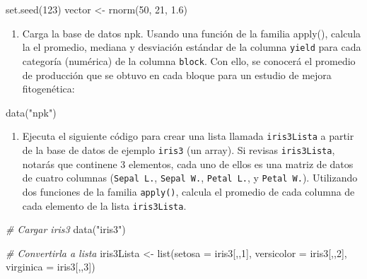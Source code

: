 \documentclass[
]{article}
\newenvironment{Shaded}{\begin{snugshade}}{\end{snugshade}}
\newcommand{\AttributeTok}[1]{\textcolor[rgb]{0.77,0.63,0.00}{#1}}
\newcommand{\CommentTok}[1]{\textcolor[rgb]{0.56,0.35,0.01}{\textit{#1}}}
\newcommand{\DecValTok}[1]{\textcolor[rgb]{0.00,0.00,0.81}{#1}}
\newcommand{\FloatTok}[1]{\textcolor[rgb]{0.00,0.00,0.81}{#1}}
\newcommand{\FunctionTok}[1]{\textcolor[rgb]{0.00,0.00,0.00}{#1}}
\newcommand{\NormalTok}[1]{#1}
\newcommand{\OtherTok}[1]{\textcolor[rgb]{0.56,0.35,0.01}{#1}}
\newcommand{\StringTok}[1]{\textcolor[rgb]{0.31,0.60,0.02}{#1}}
\providecommand{\tightlist}{%
  \setlength{\itemsep}{0pt}\setlength{\parskip}{0pt}}
\theoremstyle{definition}
\theoremstyle{definition}
\theoremstyle{definition}
\theoremstyle{definition}
\theoremstyle{remark}
\begin{document}
\begin{Shaded}
\begin{Highlighting}[]
\FunctionTok{set.seed}\NormalTok{(}\DecValTok{123}\NormalTok{)}
\NormalTok{vector }\OtherTok{\textless{}{-}} \FunctionTok{rnorm}\NormalTok{(}\DecValTok{50}\NormalTok{, }\DecValTok{21}\NormalTok{, }\FloatTok{1.6}\NormalTok{)}
\end{Highlighting}
\end{Shaded}

\begin{enumerate}
\def\labelenumi{\arabic{enumi}.}
\tightlist
\item
  Carga la base de datos npk. Usando una función de la familia apply(), calcula la el promedio, mediana y desviación estándar de la columna \texttt{yield} para cada categoría (numérica) de la columna \texttt{block}. Con ello, se conocerá el promedio de producción que se obtuvo en cada bloque para un estudio de mejora fitogenética:
\end{enumerate}

\begin{Shaded}
\begin{Highlighting}[]
\FunctionTok{data}\NormalTok{(}\StringTok{"npk"}\NormalTok{)}
\end{Highlighting}
\end{Shaded}

\begin{enumerate}
\def\labelenumi{\arabic{enumi}.}
\tightlist
\item
  Ejecuta el siguiente código para crear una lista llamada \texttt{iris3Lista} a partir de la base de datos de ejemplo \texttt{iris3} (un array). Si revisas \texttt{iris3Lista}, notarás que continene 3 elementos, cada uno de ellos es una matriz de datos de cuatro columnas (\texttt{Sepal\ L.}, \texttt{Sepal\ W.}, \texttt{Petal\ L.}, y \texttt{Petal\ W.}). Utilizando dos funciones de la familia \texttt{apply()}, calcula el promedio de cada columna de cada elemento de la lista \texttt{iris3Lista}.
\end{enumerate}

\begin{Shaded}
\begin{Highlighting}[]
\CommentTok{\# Cargar iris3}
\FunctionTok{data}\NormalTok{(}\StringTok{"iris3"}\NormalTok{)}

\CommentTok{\# Convertirla a lista}
\NormalTok{iris3Lista }\OtherTok{\textless{}{-}} \FunctionTok{list}\NormalTok{(}\AttributeTok{setosa =}\NormalTok{ iris3[,,}\DecValTok{1}\NormalTok{],}
                \AttributeTok{versicolor =}\NormalTok{ iris3[,,}\DecValTok{2}\NormalTok{],}
                \AttributeTok{virginica =}\NormalTok{ iris3[,,}\DecValTok{3}\NormalTok{])}
\end{Highlighting}
\end{Shaded}
\end{document}
